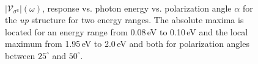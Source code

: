 \documentclass[prb,11pt,tightenlines,twocolumn,aps]{revtex4-1}
\begin{document}
\begin{figure}[t]
    \centering
    \\

    \caption{\color{red} $|\mathcal{V}_{\sigma^{\mathrm{z}}}|(\omega)$, response
    vs. photon energy vs. polarization angle $\alpha$ for the \emph{up}
    structure for two energy ranges. The absolute maxima is located for an
    energy range from 0.08\,eV to 0.10\,eV and the local maximum from 1.95\,eV
    to 2.0\,eV and both for polarization angles between $25^{\circ}$ and
    $50^{\circ}$.}
    \label{fig:up-3d-vsz}
\end{figure}
\end{document}
